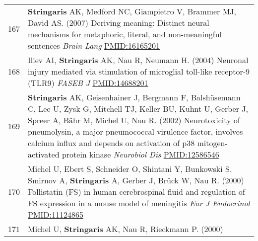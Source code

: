 \documentclass[
]{article}
\begin{document}
\begin{longtable}[]{@{}ll@{}}
\begin{minipage}[t]{0.01\columnwidth}\raggedright
167\strut
\end{minipage} & \begin{minipage}[t]{0.94\columnwidth}\raggedright
\textbf{Stringaris} AK, Medford NC, Giampietro V, Brammer MJ, David AS.
(2007) Deriving meaning: Distinct neural mechanisms for metaphoric,
literal, and non-meaningful sentences \emph{Brain Lang}
\url{PMID:16165201}\strut
\end{minipage}\tabularnewline
\begin{minipage}[t]{0.01\columnwidth}\raggedright
168\strut
\end{minipage} & \begin{minipage}[t]{0.94\columnwidth}\raggedright
Iliev AI, \textbf{Stringaris} AK, Nau R, Neumann H. (2004) Neuronal
injury mediated via stimulation of microglial toll-like receptor-9
(TLR9) \emph{FASEB J} \url{PMID:14688201}\strut
\end{minipage}\tabularnewline
\begin{minipage}[t]{0.01\columnwidth}\raggedright
169\strut
\end{minipage} & \begin{minipage}[t]{0.94\columnwidth}\raggedright
\textbf{Stringaris} AK, Geisenhainer J, Bergmann F, Balshüsemann C, Lee
U, Zysk G, Mitchell TJ, Keller BU, Kuhnt U, Gerber J, Spreer A, Bähr M,
Michel U, Nau R. (2002) Neurotoxicity of pneumolysin, a major
pneumococcal virulence factor, involves calcium influx and depends on
activation of p38 mitogen-activated protein kinase \emph{Neurobiol Dis}
\url{PMID:12586546}\strut
\end{minipage}\tabularnewline
\begin{minipage}[t]{0.01\columnwidth}\raggedright
170\strut
\end{minipage} & \begin{minipage}[t]{0.94\columnwidth}\raggedright
Michel U, Ebert S, Schneider O, Shintani Y, Bunkowski S, Smirnov A,
\textbf{Stringaris} A, Gerber J, Brück W, Nau R. (2000) Follistatin (FS)
in human cerebrospinal fluid and regulation of FS expression in a mouse
model of meningitis \emph{Eur J Endocrinol} \url{PMID:11124865}\strut
\end{minipage}\tabularnewline
\begin{minipage}[t]{0.01\columnwidth}\raggedright
171\strut
\end{minipage} & \begin{minipage}[t]{0.94\columnwidth}\raggedright
Michel U, \textbf{Stringaris} AK, Nau R, Rieckmann P. (2000)

\end{minipage}
\end{longtable}
\end{document}
